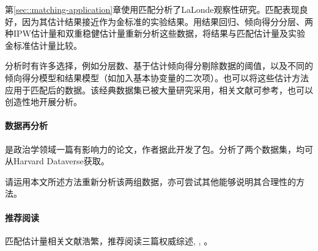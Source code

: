 第\ref{sec::matching-application}章使用匹配分析了LaLonde观察性研究。匹配表现良好，因为其估计结果接近作为金标准的实验结果。用结果回归、倾向得分分层、两种IPW估计量和双重稳健估计量重新分析这些数据，将结果与匹配估计量及实验金标准估计量比较。

分析时有许多选择，例如分层数、基于估计倾向得分剔除数据的阈值，以及不同的倾向得分模型和结果模型（如加入基本协变量的二次项）。也可以将这些估计方法应用于匹配后的数据。该经典数据集已被大量研究采用，相关文献可参考\citep{dehejia1999causal, hainmueller2012entropy}，也可以创造性地开展分析。



\paragraph{数据再分析}

\citet{ho2007matching}是政治学领域一篇有影响力的论文，作者据此开发了包\citep{ho2011matchit}。\citet{ho2007matching}分析了两个数据集，均可从Harvard Dataverse获取。

请运用本文所述方法重新分析该两组数据，亦可尝试其他能够说明其合理性的方法。


 \paragraph{推荐阅读}
 
匹配估计量相关文献浩繁，推荐阅读三篇权威综述\citet{sekhon2009opiates}, \citet{stuart2010matching}, \citet{imbens2015matching}。 


 

 
